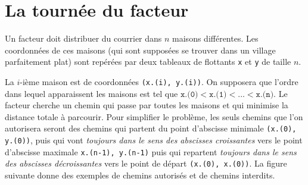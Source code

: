 \section{La tournée du facteur}

Un facteur doit distribuer du courrier dans $n$ maisons différentes. Les coordonnées de ces maisons (qui sont supposées se trouver dans un village parfaitement plat) sont repérées par deux tableaux de flottants \texttt{x} et \texttt{y} de taille $n$.
\medskip

La $i$-ième maison est de coordonnées \texttt{(x.(i), y.(i))}. On supposera que l'ordre dans lequel apparaissent les maisons est tel que $\texttt{x.(0)} < \texttt{x.(1)} < ... < \texttt{x.(n)}$. Le facteur cherche un chemin qui passe par toutes les maisons et qui minimise la distance totale à parcourir. Pour simplifier le problème, les seuls chemins que l'on autorisera seront des chemins qui partent du point d'abscisse minimale \texttt{(x.(0), y.(0))}, puis qui vont \textit{toujours dans le sens des abscisses croissantes} vers le point d'abscisse maximale \texttt{x.(n-1), y.(n-1)} puis qui repartent \textit{toujours dans le sens des abscisses décroissantes} vers le point de départ \texttt{(x.(0), x.(0))}. La figure suivante donne des exemples de chemins autorisés et de chemins interdits.
\bigskip

\hspace{1cm}
\vspace{-1cm}

